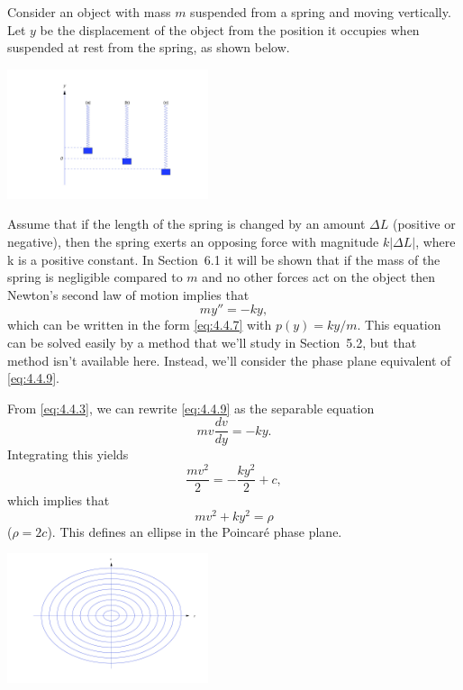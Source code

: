 \documentclass{ximera}
\begin{document}
\begin{example}\label{example:4.4.1}
 Consider an object with mass $m$ suspended from a
spring and moving vertically. Let $y$ be the displacement of the
object from the position it occupies when suspended at rest from the
spring, as shown below.

\begin{image}
 \includegraphics[height=1.5in]{fig040402.jpg} 
\end{image}

Assume that if the length of the spring is changed by an amount
$\Delta L$ (positive or negative), then the spring exerts an opposing
force with magnitude $k|\Delta L|$, where k is a positive constant. In
Section~6.1 it will be shown that if the mass of the spring
is negligible compared to $m$ and no other forces act on the object then
Newton's second law of motion implies that
\begin{equation} \label{eq:4.4.9}
my''=-ky,
\end{equation}
which can be written in the form \eqref{eq:4.4.7} with $p(y)=ky/m$. This
equation can be solved easily by a method that we'll study in
Section~5.2, but that method isn't available here. Instead,
we'll consider the phase plane equivalent of \eqref{eq:4.4.9}.

From \eqref{eq:4.4.3}, we can rewrite \eqref{eq:4.4.9} as the separable
equation
$$
 mv\frac{dv}{dy}=-ky.
$$
Integrating this  yields
$$
\frac{mv^2}{2}=-\frac{ky^2}{2}+c,
$$
which implies that
\begin{equation} \label{eq:4.4.10}
mv^2+ky^2=\rho
\end{equation}
($\rho=2c$). This defines an ellipse in the Poincar\'e phase plane.


\begin{image}
 \includegraphics[height=1.5in]{fig040403.jpg} 
\end{image}



\end{example}
\end{document}
